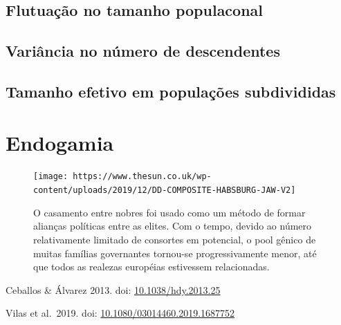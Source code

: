 \documentclass[
]{book}
\begin{document}
\hypertarget{flutuauxe7uxe3o-no-tamanho-populaconal}{%
\section{Flutuação no tamanho populaconal}\label{flutuauxe7uxe3o-no-tamanho-populaconal}}

\hypertarget{variuxe2ncia-no-nuxfamero-de-descendentes}{%
\section{Variância no número de descendentes}\label{variuxe2ncia-no-nuxfamero-de-descendentes}}

\hypertarget{tamanho-efetivo-em-populauxe7uxf5es-subdivididas}{%
\section{Tamanho efetivo em populações subdivididas}\label{tamanho-efetivo-em-populauxe7uxf5es-subdivididas}}

\hypertarget{section-1}{%
\section{}\label{section-1}}

\hypertarget{endogamia}{%
\chapter{Endogamia}\label{endogamia}}

\begin{figure}

{\centering \texttt{[image: https://www.thesun.co.uk/wp-content/uploads/2019/12/DD-COMPOSITE-HABSBURG-JAW-V2]} 

}

\caption{O casamento entre nobres foi usado como um método de formar alianças políticas entre as elites. Com o tempo, devido ao número relativamente limitado de consortes em potencial, o pool gênico de muitas famílias governantes tornou-se progressivamente menor, até que todos as realezas européias estivessem relacionadas.}\label{fig:habsburg}
\end{figure}

Ceballos \& Álvarez 2013. doi: \href{https://doi.org/10.1038/hdy.2013.25}{10.1038/hdy.2013.25}

Vilas et al.~2019. doi: \href{https://doi.org/10.1080/03014460.2019.1687752}{10.1080/03014460.2019.1687752}
\end{document}
